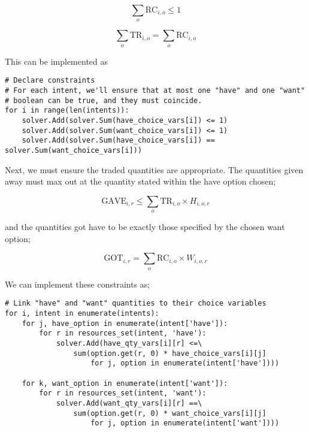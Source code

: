 \begin{equation}
    \sum_o \text{RC}_{i, o} \leq 1
\end{equation}

\begin{equation}
    \sum_o \text{TR}_{i, o} = \sum_o \text{RC}_{i, o}
\end{equation}

This can be implemented as

\begin{verbatim}
# Declare constraints
# For each intent, we'll ensure that at most one "have" and one "want"
# boolean can be true, and they must coincide.
for i in range(len(intents)):
    solver.Add(solver.Sum(have_choice_vars[i]) <= 1)
    solver.Add(solver.Sum(want_choice_vars[i]) <= 1)
    solver.Add(solver.Sum(have_choice_vars[i]) == solver.Sum(want_choice_vars[i]))
\end{verbatim}

Next, we must ensure the traded quantities are appropriate. The quantities given away must max out at the quantity stated within the have option chosen;

\begin{equation}
    \text{GAVE}_{i, r} \leq \sum_{o} \text{TR}_{i, o} \times H_{i, o, r}
\end{equation}

and the quantities got have to be exactly those specified by the chosen want option;

\begin{equation}
    \text{GOT}_{i, r} = \sum_{o} \text{RC}_{i, o} \times W_{i, o, r}
\end{equation}

We can implement these constraints as;

\begin{verbatim}
# Link "have" and "want" quantities to their choice variables
for i, intent in enumerate(intents):
    for j, have_option in enumerate(intent['have']):
        for r in resources_set(intent, 'have'):
            solver.Add(have_qty_vars[i][r] <=\
                sum(option.get(r, 0) * have_choice_vars[i][j]
                    for j, option in enumerate(intent['have'])))
    
    for k, want_option in enumerate(intent['want']):
        for r in resources_set(intent, 'want'):
            solver.Add(want_qty_vars[i][r] ==\
                sum(option.get(r, 0) * want_choice_vars[i][j] 
                    for j, option in enumerate(intent['want'])))
\end{verbatim}

